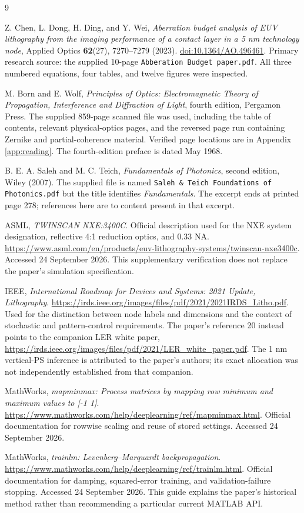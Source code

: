 \begin{thebibliography}{9}
Z. Chen, L. Dong, H. Ding, and Y. Wei,
\emph{Aberration budget analysis of EUV lithography from the imaging
performance of a contact layer in a 5 nm technology node},
Applied Optics \textbf{62}(27), 7270--7279 (2023).
\href{https://doi.org/10.1364/AO.496461}{doi:10.1364/AO.496461}.
Primary research source: the supplied 10-page
\texttt{Abberation Budget paper.pdf}. All three numbered equations,
four tables, and twelve figures were inspected.

M. Born and E. Wolf, \emph{Principles of Optics:
Electromagnetic Theory of Propagation, Interference and Diffraction of Light},
fourth edition, Pergamon Press.
The supplied 859-page scanned file was used, including the table of
contents, relevant physical-optics pages, and the reversed page run
containing Zernike and partial-coherence material.
Verified page locations are in Appendix \ref{app:reading}.
The fourth-edition preface is dated May 1968.

B. E. A. Saleh and M. C. Teich, \emph{Fundamentals of Photonics},
second edition, Wiley (2007).
The supplied file is named \texttt{Saleh \& Teich Foundations of Photonics.pdf}
but the title identifies \emph{Fundamentals}. The excerpt ends at printed
page 278; references here are to content present in that excerpt.

ASML, \emph{TWINSCAN NXE:3400C}.
Official description used for the NXE system designation, reflective
4:1 reduction optics, and 0.33 NA.
\url{https://www.asml.com/en/products/euv-lithography-systems/twinscan-nxe3400c}.
Accessed 24 September 2026. This supplementary verification does not
replace the paper's simulation specification.

IEEE, \emph{International Roadmap for Devices and Systems: 2021 Update,
Lithography}.
\url{https://irds.ieee.org/images/files/pdf/2021/2021IRDS_Litho.pdf}.
Used for the distinction between node labels and dimensions and the
context of stochastic and pattern-control requirements.
The paper's reference 20 instead points to the companion LER white paper,
\url{https://irds.ieee.org/images/files/pdf/2021/LER_white_paper.pdf}.
The 1 nm vertical-PS inference is attributed to the paper's authors;
its exact allocation was not independently established from that companion.

MathWorks, \emph{mapminmax: Process matrices by mapping row minimum
and maximum values to [-1 1]}.
\url{https://www.mathworks.com/help/deeplearning/ref/mapminmax.html}.
Official documentation for rowwise scaling and reuse of stored settings.
Accessed 24 September 2026.

MathWorks, \emph{trainlm: Levenberg--Marquardt backpropagation}.
\url{https://www.mathworks.com/help/deeplearning/ref/trainlm.html}.
Official documentation for damping, squared-error training, and
validation-failure stopping. Accessed 24 September 2026.
This guide explains the paper's historical method rather than
recommending a particular current MATLAB API.
\end{thebibliography}
